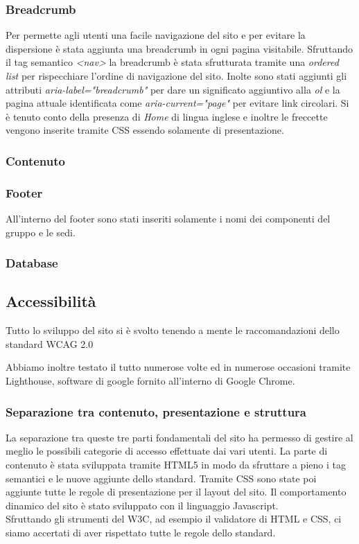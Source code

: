 \subsubsection{Breadcrumb}
Per permette agli utenti una facile navigazione del sito e per evitare la dispersione è stata aggiunta una breadcrumb in ogni pagina visitabile. Sfruttando il tag semantico \textit{<nav>} la breadcrumb è stata sfrutturata tramite una \textit{ordered list} per rispecchiare l'ordine di navigazione del sito. Inolte sono stati aggiunti gli attributi \textit{aria-label="breadcrumb"} per dare un significato aggiuntivo alla \textit{ol} e la pagina attuale identificata come \textit{aria-current="page"} per evitare link circolari. Si è tenuto conto della presenza di \textit{Home} di lingua inglese e inoltre le freccette vengono inserite tramite CSS essendo solamente di presentazione.

\subsubsection{Contenuto}
\subsubsection{Footer}
All'interno del footer sono stati inseriti solamente i nomi dei componenti del gruppo e le sedi.
\subsubsection{Database}

\subsection{Accessibilità}
Tutto lo sviluppo del sito si è svolto tenendo a mente le raccomandazioni dello standard WCAG 2.0

Abbiamo inoltre testato il tutto numerose volte ed in numerose occasioni tramite Lighthouse, software di google fornito all'interno di Google Chrome.

\subsubsection{Separazione tra contenuto, presentazione e struttura}
La separazione tra queste tre parti fondamentali del sito ha permesso di gestire al meglio le possibili categorie di accesso effettuate dai vari utenti. La parte di contenuto è stata sviluppata tramite HTML5 in modo da sfruttare a pieno i tag semantici e le nuove aggiunte dello standard. Tramite CSS sono state poi aggiunte tutte le regole di presentazione per il layout del sito. Il comportamento dinamico del sito è stato sviluppato con il linguaggio Javascript.\\ Sfruttando gli strumenti del W3C, ad esempio il validatore di HTML e CSS, ci siamo accertati di aver rispettato tutte le regole dello standard.

